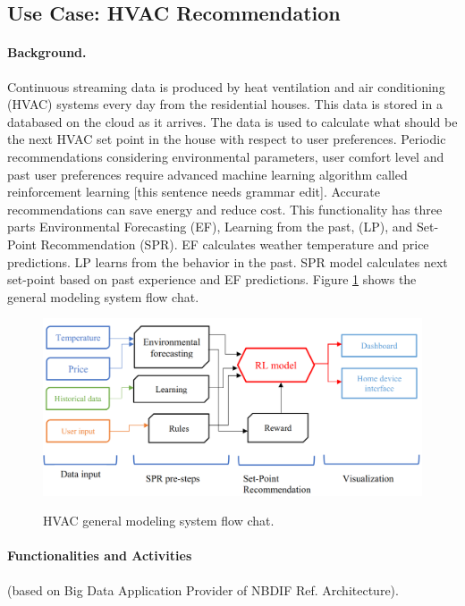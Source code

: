 \subsection{Use Case: HVAC Recommendation}


\paragraph*{Background.}

Continuous streaming data is produced by heat ventilation and air conditioning (HVAC) systems every
day from the residential houses. This data is stored in a databased on the cloud as it arrives. The data
is used to calculate what should be the next HVAC set point in the house with respect to user
preferences. Periodic recommendations considering environmental parameters, user comfort level
and past user preferences require advanced machine learning algorithm called reinforcement
learning [this sentence needs grammar edit]. Accurate recommendations can save energy and reduce cost. This functionality has three
parts Environmental Forecasting (EF), Learning from the past, (LP), and Set-Point Recommendation
(SPR). EF calculates weather temperature and price predictions. LP learns from the behavior in the
past. SPR model calculates next set-point based on past experience and EF predictions. Figure \ref{fig:hvac-1} shows
the general modeling system flow chat.

\begin{figure}[htb]
\includegraphics[width=1.0\textwidth]{usecase/hvac.png}
\label{fig:hvac-1}
\caption{HVAC general modeling system flow chat.}
\end{figure}



\paragraph*{Functionalities and Activities} (based on Big Data Application Provider of NBDIF Ref. Architecture).


